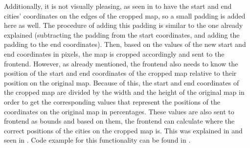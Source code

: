Additionally, it is not visually pleasing, as seen in  to have the start and end cities' coordinates on the edges of the
cropped map, so a small padding is added here as well. The procedure of adding this padding is similar to the one already explained (subtracting
the padding from the start coordinates, and adding the padding to the end coordinates). Then, based on the values of the new start and end
coordinates in pixels, the map is cropped accordingly and sent to the frontend. However, as already mentioned, the frontend also needs to know the
position of the start and end coordinates of the cropped map relative to their position on the original map. Because of this, the start and end
coordinates of the cropped map are divided by the width and the height of the original map in order to get the corresponding values that represent
the positions of the coordinates on the original map in percentages. These values are also sent to frontend as bounds and based on them, the frontend
can calculate where the correct positions of the cities on the cropped map is. This was explained in  and seen
in . Code example for this functionality can be found in .

